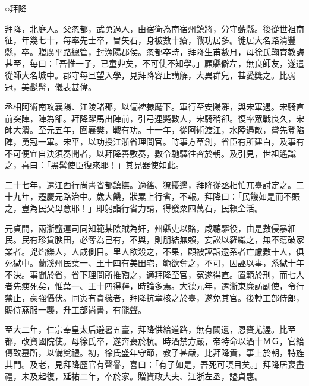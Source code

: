 \begin{pinyinscope}
 ○拜降



 拜降，北庭人。父忽都，武勇過人，由宿衛為南宿州鎮將，分守蘄縣。後從世祖南征，年幾七十，每率先士卒，冒矢石，身被數十瘡，戰功居多。徙居大名路清豐縣，卒。贈廣平路總管，封漁陽郡侯。忽都卒時，拜降生甫數月，母徐氏鞠育教誨甚至，每曰：「吾惟一子，已童丱矣，不可使不知學。」顧縣僻左，無良師友，遂遣從師大名城中。郡守每旦望入學，見拜降容止講解，大異群兒，甚愛獎之。比弱冠，美髭髯，儀表甚偉。



 丞相阿術南攻襄陽、江陵諸郡，以偏裨隸麾下。軍行至安陽灘，與宋軍遇。宋騎直前突陣，陣為卻。拜降躍馬出陣前，引弓連斃數人，宋騎稍卻。復率眾戰良久，宋師大潰。至元五年，圍襄樊，戰有功。十一年，從阿術渡江，水陸遇敵，嘗先登陷陣，勇冠一軍。宋平，以功授江浙省理問官。時事方草創，省臣有所建白，及事有不可便宜自決須奏聞者，以拜降善敷奏，數令馳驛往咨於朝。及引見，世祖遙識之，喜曰：「黑髯使臣復來耶！」其見器使如此。



 二十七年，遷江西行尚書省都鎮撫。適徭、獠擾邊，拜降從丞相忙兀臺討定之。二十九年，遷慶元路治中。歲大饑，狀累上行省，不報。拜降曰：「民饑如是而不賑之，豈為民父母意耶！」即躬詣行省力請，得發粟四萬石，民賴全活。



 元貞間，兩浙鹽運司同知範某陰賊為奸，州縣吏以賂，咸聽驅役，由是數侵暴細民。民有珍貨腴田，必奪為己有，不與，則朋結無賴，妄訟以羅織之，無不蕩破家業者。兇焰鑠人，人咸側目。里人欲殺之，不果，顧被誣訴逮系者亡慮數十人，俱死獄中。蘭溪州民葉一、王十四有美田宅，範欲奪之，不可，因誣以事，系獄十年不決。事聞於省，省下理問所推鞫之，適拜降至官，冤遂得直。置範於刑，而七人者先瘐死矣，惟葉一、王十四得釋，時論多焉。大德元年，遷浙東廉訪副使，令行禁止，豪強懾伏。同寅有貪穢者，拜降抗章核之於臺，遂免其官。後轉工部侍郎，賜侍燕服一襲，升工部尚書，有能聲。



 至大二年，仁宗奉皇太后避暑五臺，拜降供給道路，無有闕遺，恩賚尤渥。比至都，改資國院使。母徐氏卒，遂奔喪於杭。時酒禁方嚴，帝特命以酒十ＭＧ，官給傳致墓所，以備奠禮。初，徐氏盛年守節，教子甚嚴，比拜降貴，事上於朝，特旌其門。及老，見拜降歷官有聲譽，喜曰：「有子如是，吾死可瞑目矣。」拜降居喪盡禮，未及起復，延祐二年，卒於家。贈資政大夫、江浙左丞，謚貞惠。



\end{pinyinscope}